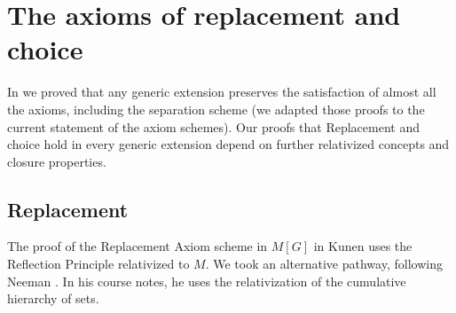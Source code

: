 \section{The axioms of replacement and choice}
\label{sec:axioms-replacement-choice}

In \cite{2019arXiv190103313G} we proved that any generic extension
preserves the satisfaction of almost all the axioms, including the separation scheme
(we adapted those proofs to the current statement of the axiom
schemes). Our proofs that Replacement and choice hold in every generic
extension depend on further relativized concepts and closure properties.

\subsection{Replacement}

The proof of the Replacement Axiom scheme in $M[G]$ in Kunen uses the
Reflection Principle relativized to $M$. We took an alternative
pathway, following Neeman \cite{neeman-course}. In his course notes,
he uses the relativization of the cumulative hierarchy of sets. 

